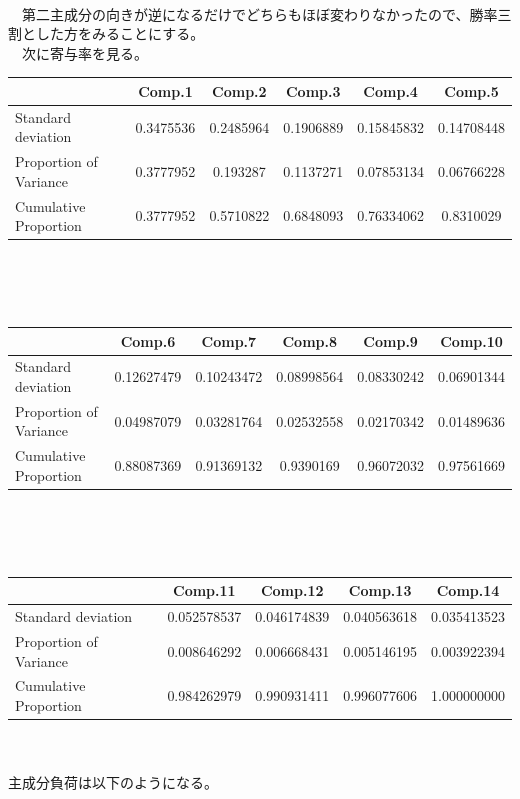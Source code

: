 \documentclass[11pt,a4paper,dvipdfmx]{jsarticle}
\begin{document}
\\
　第二主成分の向きが逆になるだけでどちらもほぼ変わりなかったので、勝率三割とした方をみることにする。
\\
　次に寄与率を見る。
\\
\begin{tabular}{l||c|c|c|c|c}
    & Comp.1 & Comp.2 & Comp.3 & Comp.4 & Comp.5 \\ \hline
Standard deviation & 0.3475536 & 0.2485964 & 0.1906889 & 0.15845832 & 0.14708448 \\
Proportion of Variance & 0.3777952 & 0.193287 & 0.1137271 & 0.07853134 & 0.06766228 \\
Cumulative Proportion  & 0.3777952 & 0.5710822 & 0.6848093 & 0.76334062 & 0.8310029 \\    
\end{tabular}
\\
\\
\\
\begin{tabular}{l||c|c|c|c|c}
    & Comp.6 & Comp.7 & Comp.8 & Comp.9 & Comp.10 \\ \hline
    Standard deviation & 0.12627479 & 0.10243472 & 0.08998564 & 0.08330242 & 0.06901344 \\
    Proportion of Variance & 0.04987079 & 0.03281764 & 0.02532558 & 0.02170342 & 0.01489636 \\
    Cumulative Proportion & 0.88087369 & 0.91369132 & 0.9390169 & 0.96072032 & 0.97561669 \\
\end{tabular}
\\
\\
\\
\begin{tabular}{l||c|c|c|c|}
    & Comp.11 & Comp.12 & Comp.13 & Comp.14 \\ \hline
    Standard deviation & 0.052578537 & 0.046174839 & 0.040563618 & 0.035413523 \\
    Proportion of Variance & 0.008646292 & 0.006668431 & 0.005146195 & 0.003922394 \\
    Cumulative Proportion & 0.984262979 & 0.990931411 & 0.996077606 & 1.000000000 \\   
\end{tabular}
\\
\\
主成分負荷は以下のようになる。
\end{document}
